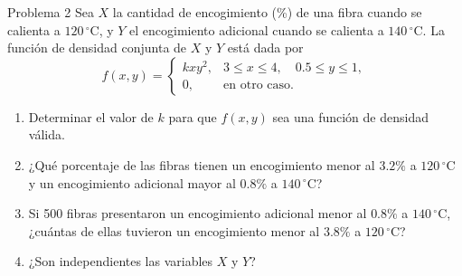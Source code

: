 \documentclass[11pt,letterpaper]{article}
\begin{document}
\begin{problema}{Problema 2}
Sea \(X\) la cantidad de encogimiento (\%) de una fibra cuando se calienta a \(120\,^{\circ}\mathrm{C}\), y \(Y\) el encogimiento adicional cuando se calienta a \(140\,^{\circ}\mathrm{C}\). La función de densidad conjunta de \(X\) y \(Y\) está dada por
\[
f(x,y)=
\begin{cases}
 kxy^2, & 3\leq x\leq4,\quad 0.5\leq y\leq1,\\
 0, & \text{en otro caso}.
\end{cases}
\]

\begin{enumerate}
\item Determinar el valor de \(k\) para que \(f(x,y)\) sea una función de densidad válida.
\item ¿Qué porcentaje de las fibras tienen un encogimiento menor al \(3.2\%\) a \(120\,^{\circ}\mathrm{C}\) y un encogimiento adicional mayor al \(0.8\%\) a \(140\,^{\circ}\mathrm{C}\)?
\item Si 500 fibras presentaron un encogimiento adicional menor al \(0.8\%\) a \(140\,^{\circ}\mathrm{C}\), ¿cuántas de ellas tuvieron un encogimiento menor al \(3.8\%\) a \(120\,^{\circ}\mathrm{C}\)?
\item ¿Son independientes las variables \(X\) y \(Y\)?
\end{enumerate}
\end{problema}
\end{document}
